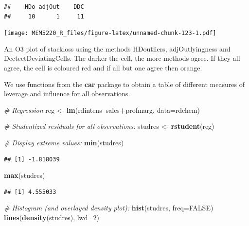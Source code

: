 \documentclass[]{book}
\newenvironment{Shaded}{\begin{snugshade}}{\end{snugshade}}
\newcommand{\CommentTok}[1]{\textcolor[rgb]{0.56,0.35,0.01}{\textit{#1}}}
\newcommand{\DataTypeTok}[1]{\textcolor[rgb]{0.13,0.29,0.53}{#1}}
\newcommand{\DecValTok}[1]{\textcolor[rgb]{0.00,0.00,0.81}{#1}}
\newcommand{\KeywordTok}[1]{\textcolor[rgb]{0.13,0.29,0.53}{\textbf{#1}}}
\newcommand{\NormalTok}[1]{#1}
\newcommand{\OperatorTok}[1]{\textcolor[rgb]{0.81,0.36,0.00}{\textbf{#1}}}
\newcommand{\OtherTok}[1]{\textcolor[rgb]{0.56,0.35,0.01}{#1}}
\newcommand{\StringTok}[1]{\textcolor[rgb]{0.31,0.60,0.02}{#1}}
\begin{document}
\begin{verbatim}
##    HDo adjOut    DDC 
##     10      1     11
\end{verbatim}

\begin{Shaded}
\end{Shaded}

\texttt{[image: MEM5220\_R\_files/figure-latex/unnamed-chunk-123-1.pdf]}

An O3 plot of stackloss using the methods HDoutliers, adjOutlyingness
and DectectDeviatingCells. The darker the cell, the more methods agree.
If they all agree, the cell is coloured red and if all but one agree
then orange.

We use functions from the \textbf{car} package to obtain a table of
different measures of leverage and influence for all observations.

\begin{Shaded}
\begin{Highlighting}[]
\CommentTok{# Regression}
\NormalTok{reg <-}\StringTok{ }\KeywordTok{lm}\NormalTok{(rdintens}\OperatorTok{~}\NormalTok{sales}\OperatorTok{+}\NormalTok{profmarg, }\DataTypeTok{data=}\NormalTok{rdchem)}

\CommentTok{# Studentized residuals for all observations:}
\NormalTok{studres <-}\StringTok{ }\KeywordTok{rstudent}\NormalTok{(reg)}

\CommentTok{# Display extreme values:}
\KeywordTok{min}\NormalTok{(studres)}
\end{Highlighting}
\end{Shaded}

\begin{verbatim}
## [1] -1.818039
\end{verbatim}

\begin{Shaded}
\begin{Highlighting}[]
\KeywordTok{max}\NormalTok{(studres)}
\end{Highlighting}
\end{Shaded}

\begin{verbatim}
## [1] 4.555033
\end{verbatim}

\begin{Shaded}
\begin{Highlighting}[]
\CommentTok{# Histogram (and overlayed density plot):}
\KeywordTok{hist}\NormalTok{(studres, }\DataTypeTok{freq=}\OtherTok{FALSE}\NormalTok{)}
\KeywordTok{lines}\NormalTok{(}\KeywordTok{density}\NormalTok{(studres), }\DataTypeTok{lwd=}\DecValTok{2}\NormalTok{)}
\end{Highlighting}
\end{Shaded}
\end{document}
